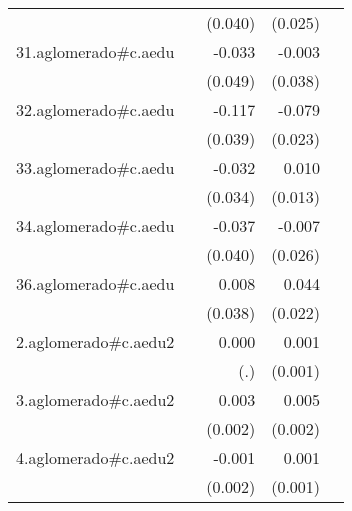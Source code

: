 {\begin{longtable}{l*{4}{D{.}{.}{-1}}}
            &                     &     (0.040)         &     (0.025)         &                     \\
\addlinespace
31.aglomerado#c.aedu&                     &      -0.033         &      -0.003         &                     \\
            &                     &     (0.049)         &     (0.038)         &                     \\
\addlinespace
32.aglomerado#c.aedu&                     &      -0.117\sym{**} &      -0.079\sym{***}&                     \\
            &                     &     (0.039)         &     (0.023)         &                     \\
\addlinespace
33.aglomerado#c.aedu&                     &      -0.032         &       0.010         &                     \\
            &                     &     (0.034)         &     (0.013)         &                     \\
\addlinespace
34.aglomerado#c.aedu&                     &      -0.037         &      -0.007         &                     \\
            &                     &     (0.040)         &     (0.026)         &                     \\
\addlinespace
36.aglomerado#c.aedu&                     &       0.008         &       0.044\sym{*}  &                     \\
            &                     &     (0.038)         &     (0.022)         &                     \\
\addlinespace
2.aglomerado#c.aedu2&                     &       0.000         &       0.001         &                     \\
            &                     &         (.)         &     (0.001)         &                     \\
\addlinespace
3.aglomerado#c.aedu2&                     &       0.003         &       0.005\sym{**} &                     \\
            &                     &     (0.002)         &     (0.002)         &                     \\
\addlinespace
4.aglomerado#c.aedu2&                     &      -0.001         &       0.001         &                     \\
            &                     &     (0.002)         &     (0.001)         &                     \\

\end{longtable}}
